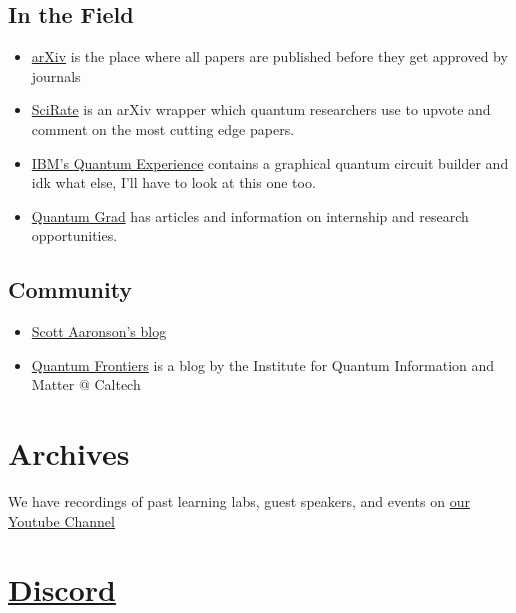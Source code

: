 \documentclass{article}
\begin{document}
\subsection{In the Field}
\begin{itemize}

	\item \href{https://arxiv.org/list/quant-ph/new}{arXiv} is the place where all papers are published before they get approved by journals

	\item \href{https://scirate.com/arxiv/quant-ph?range=14}{SciRate} is an arXiv wrapper which quantum researchers use to upvote and comment on the most cutting edge papers.

	\item \href{https://quantum-computing.ibm.com/}{IBM's Quantum Experience} contains a graphical quantum circuit builder and idk what else, I'll have to look at this one too.

	\item \href{https://www.quantumgrad.com/}{Quantum Grad} has articles and information on internship and research opportunities.
\end{itemize}

\subsection{Community}
\begin{itemize}
		

	\item \href{https://scottaaronson.blog/}{Scott Aaronson's blog}

	\item \href{https://quantumfrontiers.com/}{Quantum Frontiers} is a blog by the Institute for Quantum Information and Matter @ Caltech
\end{itemize}

\section{Archives}

We have recordings of past learning labs, guest speakers, and events on \href{https://www.youtube.com/@quantumcollective_UT}{our Youtube Channel}

\section{\href{https://discord.gg/UBnRaHuzF9}{Discord}}
\end{document}
